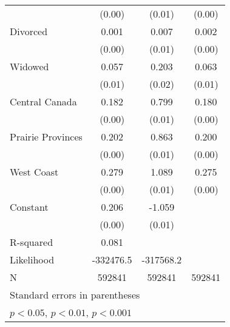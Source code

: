 {\begin{tabular}{l*{3}{c}}
                    &      (0.00)         &      (0.01)         &      (0.00)         \\
Divorced            &       0.001         &       0.007         &       0.002         \\
                    &      (0.00)         &      (0.01)         &      (0.00)         \\
Widowed             &       0.057\sym{***}&       0.203\sym{***}&       0.063\sym{***}\\
                    &      (0.01)         &      (0.02)         &      (0.01)         \\
Central Canada      &       0.182\sym{***}&       0.799\sym{***}&       0.180\sym{***}\\
                    &      (0.00)         &      (0.01)         &      (0.00)         \\
Prairie Provinces   &       0.202\sym{***}&       0.863\sym{***}&       0.200\sym{***}\\
                    &      (0.00)         &      (0.01)         &      (0.00)         \\
West Coast          &       0.279\sym{***}&       1.089\sym{***}&       0.275\sym{***}\\
                    &      (0.00)         &      (0.01)         &      (0.00)         \\
Constant            &       0.206\sym{***}&      -1.059\sym{***}&                     \\
                    &      (0.00)         &      (0.01)         &                     \\
\hline
R-squared           &       0.081         &                     &                     \\
Likelihood          &   -332476.5         &   -317568.2         &                     \\
N                   &      592841         &      592841         &      592841         \\
\hline\hline
\multicolumn{4}{l}{\footnotesize Standard errors in parentheses}\\
\multicolumn{4}{l}{\footnotesize \sym{*} \(p<0.05\), \sym{**} \(p<0.01\), \sym{***} \(p<0.001\)}\\
\end{tabular}
}
